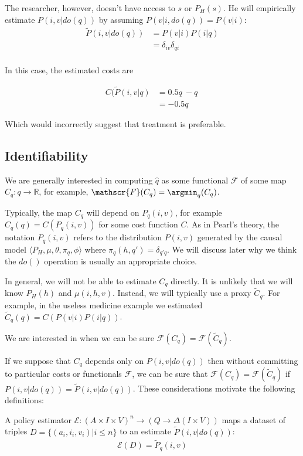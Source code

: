 The researcher, however, doesn't have access to $s$ or $P_H(s)$. He will empirically estimate $P(i,v|do(q))$ by assuming $P(v|i,do(q)) = P(v|i)$:
\begin{align}
    \tilde{P}(i,v|do(q)) &= P(v|i) P(i|q) \\
                         &= \delta_{iv} \delta_{qi} \\
\end{align}

In this case, the estimated costs are

\begin{align}
    C(\tilde{P}(i,v|q) &= 0.5q\ - q\ \\
                        &= - 0.5q\
\end{align}

Which would incorrectly suggest that treatment is preferable.

\subsection{Identifiability}

We are generally interested in computing $\hat{q}$ as some functional $\mathscr{F}$ of some map $C_q:q \to \mathbb{R}$, for example, $\mathscr{F}(C_q)=\argmin_q (C_q)$. 

Typically, the map $C_q$ will depend on $P_q(i,v)$, for example $C_q(q) = C(P_q(i,v))$ for some cost function $C$. As in Pearl's theory, the notation $P_q(i,v)$ refers to the distribution $P(i,v)$ generated by the causal model $\langle P_H, \mu, \theta, \pi_q, \phi\rangle$ where $\pi_q(h,q') = \delta_{q'q}$. We will discuss later why we think the $do()$ operation is usually an appropriate choice.

In general, we will not be able to estimate $C_q$ directly. It is unlikely that we will know $P_H(h)$ and $\mu(i,h,v)$. Instead, we will typically use a proxy $\tilde{C}_q$. For example, in the useless medicine example we estimated $\tilde{C}_q(q) = C(P(v|i)P(i|q))$.

We are interested in when we can be sure $\mathscr{F}(C_q) = \mathscr{F}(\tilde{C}_q)$.

If we suppose that $C_q$ depends only on $P(i,v|do(q))$ then without committing to particular costs or functionals $\mathscr{F}$, we can be sure that $\mathscr{F}(C_q) = \mathscr{F}(\tilde{C}_q)$ if $P(i,v|do(q))=\tilde{P}(i,v|do(q))$. These considerations motivate the following definitions:

\begin{definition}
A policy estimator $\mathscr{E}:(A\times I \times V)^n\to (Q\to \Delta(I\times V))$ maps a dataset of triples $D=\{(a_i,i_i,v_i)|i\leq n\}$ to an estimate $\tilde{P}(i,v|do(q))$:
\begin{align}
    \mathscr{E}(D) = \tilde{P}_q(i,v)
\end{align}
\end{definition}

